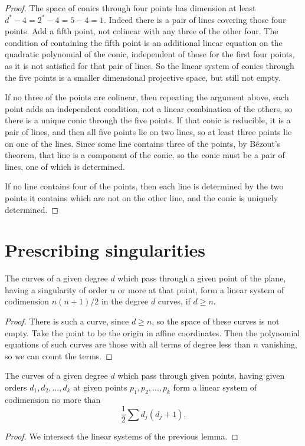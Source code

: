 \begin{proof}
The space of conics through four points has dimension at least \(d^*-4=2^*-4=5-4=1\).
Indeed there is a pair of lines covering those four points.
Add a fifth point, not colinear with any three of the other four.
The condition of containing the fifth point is an additional linear equation on the quadratic polynomial of the conic, independent of those for the first four points, as it is not satisfied for that pair of lines.
So the linear system of conics through the five points is a smaller dimensional projective space, but still not empty.

If no three of the points are colinear, then repeating the argument above, each point adds an independent condition, not a linear combination of the others, so there is a unique conic through the five points.
If that conic is reducible, it is a pair of lines, and then all five points lie on two lines, so at least three points lie on one of the lines.
Since some line contains three of the points, by B\'ezout's theorem, that line is a component of the conic, so the conic must be a pair of lines, one of which is determined.

If no line contains four of the points, then each line is determined by the two points it contains which are not on the other line, and the conic is uniquely determined.
\end{proof}

\section{Prescribing singularities}
\begin{lemma}
The curves of a given degree \(d\) which pass through a given point of the plane, having a singularity of order \(n\) or more at that point, form a linear system of codimension \(n(n+1)/2\) in the degree \(d\) curves, if \(d\ge n\).
\end{lemma}
\begin{proof}
There is such a curve, since \(d\ge n\), so the space of these curves is not empty.
Take the point to be the origin in affine coordinates.
Then the polynomial equations of such curves are those with all terms of degree less than \(n\) vanishing, so we can count the terms.
\end{proof}
\begin{theorem}\label{theorem:prescribe.singularities}
The curves of a given degree \(d\) which pass through given points, having given orders \(d_1,d_2,\dots,d_k\) at given points \(p_1,p_2,\dots,p_k\) form a linear system of codimension no more than 
\[
\frac{1}{2}\sum d_j(d_j+1).
\]
\end{theorem}
\begin{proof}
We intersect the linear systems of the previous lemma.
\end{proof}

